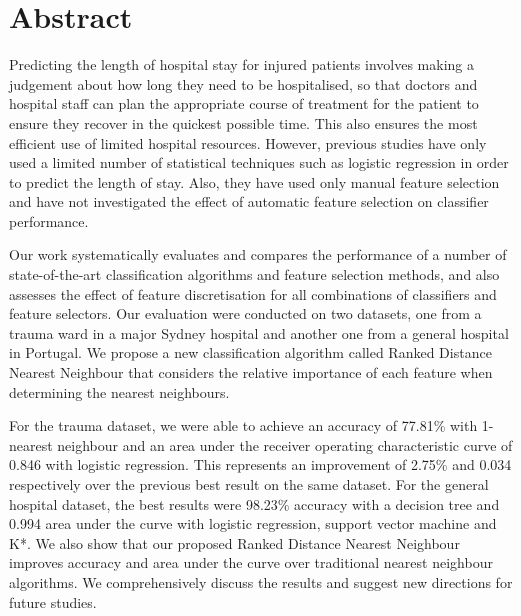 \chapter*{Abstract}

Predicting the length of hospital stay for injured patients involves making a
judgement about how long they need to be hospitalised, so that doctors and
hospital staff can plan the appropriate course of treatment for the patient
to ensure they recover in the quickest possible time. This also ensures the
most efficient use of limited hospital resources. However, previous studies
have only used a limited number of statistical techniques such as logistic
regression in order to predict the length of stay. Also, they have used only
manual feature selection and have not investigated the effect of automatic
feature selection on classifier performance.

Our work systematically evaluates and compares the performance of a number of
state-of-the-art classification algorithms and feature selection methods,
and also assesses the effect of feature discretisation for all combinations
of classifiers and feature selectors. Our evaluation were conducted on two
datasets, one from a trauma ward in a major Sydney hospital and another one
from a general hospital in Portugal. We propose a new classification algorithm
called Ranked Distance Nearest Neighbour that considers the
relative importance of each feature when determining the nearest neighbours.

For the trauma dataset, we were able to achieve an accuracy of 77.81\% with
1-nearest neighbour and an area under the receiver operating characteristic
curve of 0.846 with logistic
regression. This represents an improvement of 2.75\% and 0.034 respectively
over the previous best result on the same dataset. For the
general hospital dataset, the best results were 98.23\% accuracy with a
decision tree and 0.994 area under the curve with logistic regression,
support vector machine and K*. We also show that our proposed Ranked
Distance Nearest Neighbour improves accuracy and area under the curve over
traditional nearest neighbour algorithms. We comprehensively discuss
the results and suggest new directions for future studies.
